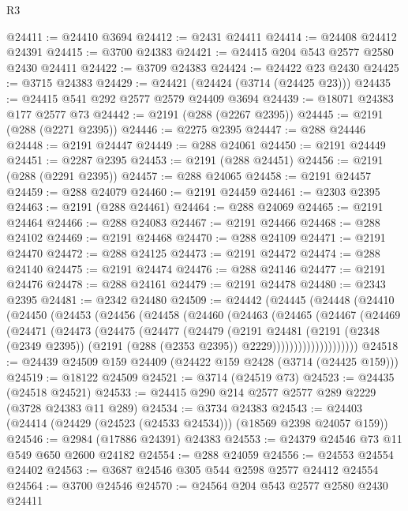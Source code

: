 \begin{lexlean}{R3}
\begin{coremodule}
@24411 := @24410 @3694
@24412 := @2431 @24411
@24414 := @24408 @24412 @24391
@24415 := @3700 @24383
@24421 := @24415 @204 @543 @2577 @2580 @2430 @24411
@24422 := @3709 @24383
@24424 := @24422 @23 @2430
@24425 := @3715 @24383
@24429 := @24421 (@24424 (@3714 (@24425 @23)))
@24435 := @24415 @541 @292 @2577 @2579 @24409 @3694
@24439 := @18071 @24383 @177 @2577 @73
@24442 := @2191 (@288 (@2267 @2395))
@24445 := @2191 (@288 (@2271 @2395))
@24446 := @2275 @2395
@24447 := @288 @24446
@24448 := @2191 @24447
@24449 := @288 @24061
@24450 := @2191 @24449
@24451 := @2287 @2395
@24453 := @2191 (@288 @24451)
@24456 := @2191 (@288 (@2291 @2395))
@24457 := @288 @24065
@24458 := @2191 @24457
@24459 := @288 @24079
@24460 := @2191 @24459
@24461 := @2303 @2395
@24463 := @2191 (@288 @24461)
@24464 := @288 @24069
@24465 := @2191 @24464
@24466 := @288 @24083
@24467 := @2191 @24466
@24468 := @288 @24102
@24469 := @2191 @24468
@24470 := @288 @24109
@24471 := @2191 @24470
@24472 := @288 @24125
@24473 := @2191 @24472
@24474 := @288 @24140
@24475 := @2191 @24474
@24476 := @288 @24146
@24477 := @2191 @24476
@24478 := @288 @24161
@24479 := @2191 @24478
@24480 := @2343 @2395
@24481 := @2342 @24480
@24509 := @24442
    (@24445
      (@24448
        (@24410
          (@24450
            (@24453
              (@24456
                (@24458
                  (@24460
                    (@24463
                      (@24465
                        (@24467
                          (@24469
                            (@24471
                              (@24473
                                (@24475
                                  (@24477
                                    (@24479
                                      (@2191
                                        @24481
                                        (@2191
                                          (@2348 (@2349 @2395))
                                          (@2191 (@288 (@2353 @2395)) @2229))))))))))))))))))))
@24518 := @24439 @24509 @159 @24409 (@24422 @159 @2428 (@3714 (@24425 @159)))
@24519 := @18122 @24509
@24521 := @3714 (@24519 @73)
@24523 := @24435 (@24518 @24521)
@24533 := @24415 @290 @214 @2577 @2577 @289 @2229 (@3728 @24383 @11 @289)
@24534 := @3734 @24383
@24543 := @24403 (@24414 (@24429 (@24523 (@24533 @24534))) (@18569 @2398 @24057 @159))
@24546 := @2984 (@17886 @24391) @24383
@24553 := @24379 @24546 @73 @11 @549 @650 @2600 @24182
@24554 := @288 @24059
@24556 := @24553 @24554 @24402
@24563 := @3687 @24546 @305 @544 @2598 @2577 @24412 @24554
@24564 := @3700 @24546
@24570 := @24564 @204 @543 @2577 @2580 @2430 @24411

\end{coremodule}
\end{lexlean}
